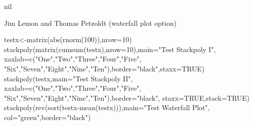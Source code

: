 \begin{Value}
nil
\end{Value}
\begin{Author}\relax
Jim Lemon and Thomas Petzoldt (waterfall plot option)
\end{Author}
\begin{SeeAlso}\relax
{}
\end{SeeAlso}
\begin{Examples}
\begin{ExampleCode}
 testx<-matrix(abs(rnorm(100)),nrow=10)
 stackpoly(matrix(cumsum(testx),nrow=10),main="Test Stackpoly I",
  xaxlab=c("One","Two","Three","Four","Five",
  "Six","Seven","Eight","Nine","Ten"),border="black",staxx=TRUE)
 stackpoly(testx,main="Test Stackpoly II",
  xaxlab=c("One","Two","Three","Four","Five",
  "Six","Seven","Eight","Nine","Ten"),border="black",
  staxx=TRUE,stack=TRUE)
 stackpoly(rev(sort(testx-mean(testx))),main="Test Waterfall Plot",
  col="green",border="black")
\end{ExampleCode}
\end{Examples}

